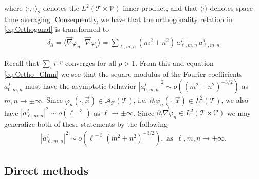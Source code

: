 \documentclass[11pt]{amsart}
\newcommand{\Tc}{\mathcal{T}}
\newcommand{\Vc}{\mathcal{V}}
\newcommand{\As}{\mathscr{A}}
\begin{document}
where $\langle\cdot,\cdot\rangle_2$ denotes the $L^2(\Tc\times\Vc)$ inner-product, and that
$\langle\cdot\rangle$ denotes space-time averaging. Consequently, we have that the
orthogonality relation in \eqref{eq:Orthogonal} is transformed to   
%
\begin{align}\label{eq:Ortho_Clmn}
  \delta_{li}=\langle\vec{\nabla}\varphi_n\cdot\vec{\nabla}\varphi_i\rangle
      = \sum_{\ell,m,n}(m^2+n^2)\,\overline{a^{\,l}_{\ell,m,n}}\,a^{\,i}_{\ell,m,n}
\end{align}
%


Recall that $\sum_ii^{-p}$ converges for all $p>1$. From this and
equation \eqref{eq:Ortho_Clmn} we see that the square modulus of the  
Fourier coefficients $a^{\,l}_{0,m,n}$ must have the asymptotic behavior 
$|a^{\,l}_{0,m,n}|^2\sim o((m^2+n^2)^{-3/2})$ as $m,n\to\pm\infty$. Since
$\varphi_n(\cdot,\vec{x})\in\tilde{\As}_{\Tc}(\Tc)$, i.e. $\partial_t\varphi_n(\cdot,\vec{x})\in L^2(\Tc)$, we also
have $|a^{\,l}_{\ell,m,n}|^2\sim o(\ell^{\,-3})$ as $\ell\to\pm\infty$. Since
$\partial_t\vec{\nabla}\varphi_n\in L^2(\Tc\times\Vc)$ we may generalize 
both of these statements by the following
%
\begin{align}\label{eq:Clmn_assymptotics}
  |a^{\,l}_{\ell,m,n}|^2\sim o(\ell^{\,-3}(m^2+n^2)^{-3/2}), \text{ as } \,\ell,m,n\to\pm\infty.
\end{align}
%





%
\subsection{Direct methods}
\label{sec:Direct_Fourier_Methods}
%
\end{document}
